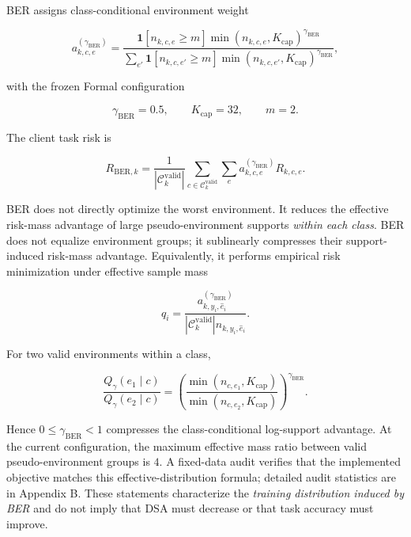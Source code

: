 BER assigns class-conditional environment weight

\[
a^{(\gamma_{\mathrm{BER}})}_{k,c,e}
=
\frac{
\mathbf 1[n_{k,c,e}\ge m]
\min(n_{k,c,e},K_{\mathrm{cap}})^{\gamma_{\mathrm{BER}}}
}{
\sum_{e'}
\mathbf 1[n_{k,c,e'}\ge m]
\min(n_{k,c,e'},K_{\mathrm{cap}})^{\gamma_{\mathrm{BER}}}
},
\]

with the frozen Formal configuration

\[
\gamma_{\mathrm{BER}}=0.5,\qquad K_{\mathrm{cap}}=32,\qquad m=2.
\]

The client task risk is

\[
R_{\mathrm{BER},k}
=
\frac1{|\mathcal C_k^{\mathrm{valid}}|}
\sum_{c\in\mathcal C_k^{\mathrm{valid}}}
\sum_e a^{(\gamma_{\mathrm{BER}})}_{k,c,e}R_{k,c,e}.
\]

BER does not directly optimize the worst environment. It reduces the effective risk-mass advantage of large pseudo-environment supports \emph{within each class}. BER does not equalize environment groups; it sublinearly compresses their support-induced risk-mass advantage. Equivalently, it performs empirical risk minimization under effective sample mass

\[
q_i=
\frac{a^{(\gamma_{\mathrm{BER}})}_{k,y_i,\hat e_i}}
{|\mathcal C_k^{\mathrm{valid}}|n_{k,y_i,\hat e_i}}.
\]

For two valid environments within a class,

\[
\frac{Q_\gamma(e_1\mid c)}{Q_\gamma(e_2\mid c)}
=
\left(
\frac{\min(n_{c,e_1},K_{\mathrm{cap}})}
{\min(n_{c,e_2},K_{\mathrm{cap}})}
\right)^{\gamma_{\mathrm{BER}}}.
\]

Hence \(0\le\gamma_{\mathrm{BER}}<1\) compresses the class-conditional log-support advantage. At the current configuration, the maximum effective mass ratio between valid pseudo-environment groups is \(4\). A fixed-data audit verifies that the implemented objective matches this effective-distribution formula; detailed audit statistics are in Appendix B. These statements characterize the \emph{training distribution induced by BER} and do not imply that DSA must decrease or that task accuracy must improve.
